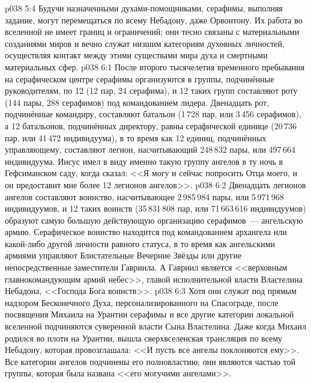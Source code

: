 \vs p038 5:4 Будучи назначенными духами\hyp{}помощниками, серафимы, выполняя задание, могут перемещаться по всему Небадону, даже Орвонтону. Их работа во вселенной не имеет границ и ограничений; они тесно связаны с материальными созданиями миров и вечно служат низшим категориям духовных личностей, осуществляя контакт между этими существами мира духа и смертными материальных сфер.
\vs p038 6:1 После второго тысячелетия временного пребывания на серафическом центре серафимы организуются в группы, подчинённые руководителям, по 12 (12 пар, 24 серафима), и 12 таких групп составляют роту (144 пары, 288 серафимов) под командованием лидера. Двенадцать рот, подчинённые командиру, составляют батальон (1\,728 пар, или 3\,456 серафимов), а 12 батальонов, подчинённых директору, равны серафической единице (20\,736 пар, или 41\,472 индивидуума), в то время как 12 единиц, подчинённых управляющему, составляют легион, насчитывающий 248\,832 пары, или 497\,664 индивидуума. Иисус имел в виду именно такую группу ангелов в ту ночь в Гефсиманском саду, когда сказал: <<Я могу и сейчас попросить Отца моего, и он предоставит мне более 12 легионов ангелов>>.
\vs p038 6:2 Двенадцать легионов ангелов составляют воинство, насчитывающее 2\,985\,984 пары, или 5\,971\,968 индивидуумов, и 12 таких воинств (35\,831\,808 пар, или 71\,663\,616 индивидуумов) образуют самую большую действующую организацию серафимов~--- ангельскую армию. Серафическое воинство находится под командованием архангела или какой\hyp{}либо другой личности равного статуса, в то время как ангельскими армиями управляют Блистательные Вечерние Звёзды или другие непосредственные заместители Гавриила. А Гавриил является <<верховным главнокомандующим армий небес>>, главой исполнительной власти Властелина Небадона, <<Господа Бога воинств>>.
\vs p038 6:3 Хотя они служат под прямым надзором Бесконечного Духа, персонализированного на Спасограде, после посвящения Михаила на Урантии серафимы и все другие категории локальной вселенной подчиняются суверенной власти Сына Властелина. Даже когда Михаил родился во плоти на Урантии, вышла сверхвселенская трансляция по всему Небадону, которая провозглашала: <<И пусть все ангелы поклоняются ему>>. Все категории ангелов подчинены его полновластию; они являются частью той группы, которая была названа <<его могучими ангелами>>.
